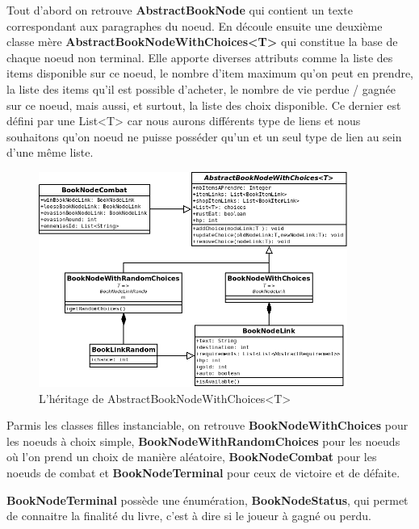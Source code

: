 			Tout d'abord on retrouve \textbf{AbstractBookNode} qui contient un texte correspondant aux paragraphes du noeud. En découle ensuite une deuxième classe mère \textbf{AbstractBookNodeWithChoices<T>} qui constitue la base de chaque noeud non terminal. Elle apporte diverses attributs comme la liste des items disponible sur ce noeud, le nombre d'item maximum qu'on peut en prendre, la liste des items qu'il est possible d'acheter, le nombre de vie perdue / gagnée sur ce noeud, mais aussi, et surtout, la liste des choix disponible. Ce dernier est défini par une List<T> car nous aurons différents type de liens et nous souhaitons qu'on noeud ne puisse posséder qu'un et un seul type de lien au sein d'une même liste.

			\begin{figure}[H]
				\centering\includegraphics[width=0.90\textwidth, keepaspectratio]{img/BookNode2.png}
				\caption{L'héritage de AbstractBookNodeWithChoices<T>}
				\label{fig:BookNode}
			\end{figure}

			Parmis les classes filles instanciable, on retrouve \textbf{BookNodeWithChoices} pour les noeuds à choix simple, \textbf{BookNodeWithRandomChoices} pour les noeuds où l'on prend un choix de manière aléatoire, \textbf{BookNodeCombat} pour les noeuds de combat et \textbf{BookNodeTerminal} pour ceux de victoire et de défaite.

			\textbf{BookNodeTerminal} possède une énumération, \textbf{BookNodeStatus}, qui permet de connaitre la finalité du livre, c'est à dire si le joueur à gagné ou perdu.

